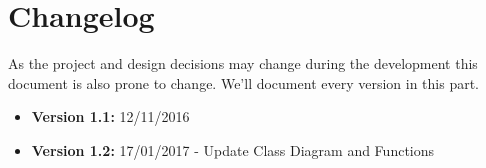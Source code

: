 \documentclass[a4paper]{article}
\begin{document}
\newpage

\section{Changelog}
As the project and design decisions may change during the development this document is also prone to change.
We'll document every version in this part.
\begin{itemize}
\item \textbf {Version 1.1:} 12/11/2016
\item \textbf {Version 1.2:} 17/01/2017 - Update Class Diagram and Functions
\end{itemize}
\end{document}

